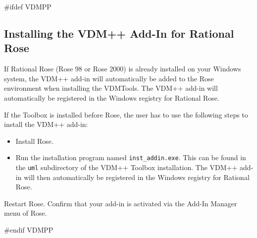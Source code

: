 \documentclass[\pformat,12pt]{article}
\newcommand{\Toolbox}{VDMTools}
\newcommand{\Toolbox}{VDMTools}
\begin{document}
\begin{enumerate}
  
    
\end{enumerate}

#ifdef VDMPP

\subsection{Installing the VDM++ Add-In for Rational Rose}

If Rational Rose (Rose 98 or Rose 2000) is already installed on your
Windows system, the VDM++ add-in will automatically be added to the Rose
environment when installing the \Toolbox{}. The VDM++ add-in will
automatically be registered in the Windows registry for Rational
Rose.

If the Toolbox is installed before Rose, the user has to
use the following steps to install the VDM++ add-in:
\begin{itemize}
\item Install Rose.
\item Run the installation program named {\tt inst\_addin.exe}.
This can be found in the {\tt uml} subdirectory of the VDM++ Toolbox installation.
The VDM++ add-in will then
automatically be registered in the Windows registry for Rational Rose.
\end{itemize}

Restart Rose. Confirm that your add-in is activated via the Add-In
Manager menu of Rose.

#endif VDMPP

\end{document}

